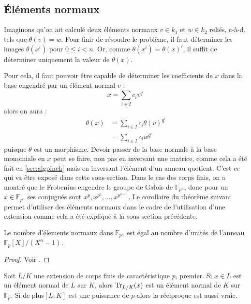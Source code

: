 \documentclass[a4paper]{article} %
\numberwithin{section}{part}
\numberwithin{equation}{section}
\newcommand\GF[1]{\mathbb{F}_{#1}}
\begin{document}
\subsection{Éléments normaux}
\label{sec:elemnorm}
Imaginons qu'on ait calculé deux éléments normaux $v\in k_1$ 
et $w\in k_2$ reliés, c-à-d. tels que $\theta(v) = w$. Pour finir de résoudre le
problème, il faut déterminer les images $\theta(x^i)$ pour $0\leq i < n$. Or, 
comme $\theta(x^i) = \theta(x)^i$, il suffit de déterminer uniquement la valeur 
de $\theta(x)$.\par
Pour cela, il faut pouvoir être capable de déterminer les coefficients de $x$
dans la base engendré par un élément normal $v$ :
\begin{equation}
\label{eq:elemnorm1}
x = \sum_{i\in I}{c_iv^{q^i}}
\end{equation}
alors on aura :
\begin{align}
\theta(x) &= \sum_{i\in I}{c_i\theta(v)^{q^i}}\label{eq:elemnorm2}\\
&= \sum_{i\in I}{c_iw^{q^i}}\label{eq:elemnorm3}
\end{align}
puisque $\theta$ est un morphisme. Devoir passer de la base normale à la base 
monomiale en $x$ peut se faire, non pas en inversant une matrice, comme cela a
été fait en \ref{sec:algpinch} mais en inversant l'élément d'un anneau quotient.
C'est ce qui va être exposé dans cette sous-section. 
Dans le cas des corps finis, on a montré que le Frobenius engendre le groupe de 
Galois de $\GF{p^n}$, donc pour un $x\in\GF{p^n}$ ses conjugués sont 
$x^p, x^{p^2},\dots,x^{p^{n-1}}$. 
Le corollaire du théorème suivant permet d'utiliser des éléments normaux 
dans le cadre de l'utilisation d'une extension comme cela a été expliqué à la
sous-section précédente.
\begin{thm}
\label{th:nbelemnorm}
Le nombre d'élements normaux dans $\GF{p^n}$ est égal au nombre d'unités de
l'anneau $\GF{p}[X]/(X^n - 1)$.\par
\end{thm}
\begin{proof}
Voir \cite[th. 3.73]{LiNi2}.
\end{proof}
\begin{cor}
\label{cor:tracenorm}
Soit $L/K$ une extension de corps finis de caractéristique $p$, premier. Si
$x\in L$ est un élément normal de $L$ sur $K$, alors $\textup{Tr}_{L/K}(x)$ est 
un élément normal de $K$ sur $\GF{p}$. Si de plus$[L:K]$ est une puissance de 
$p$ alors la réciproque est aussi vraie.
\end{cor}
\end{document}
